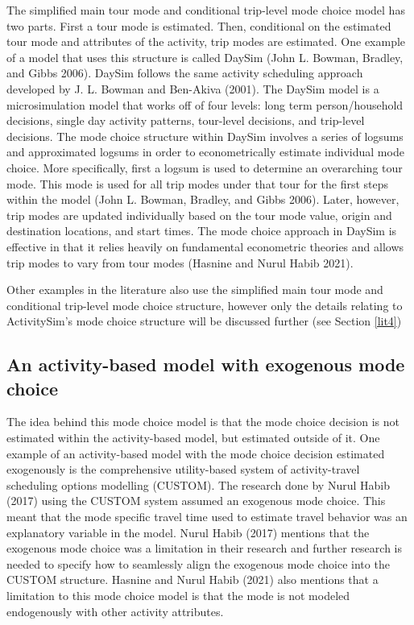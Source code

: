 \documentclass[12pt, oneside, openright]{byuthesis}
\begin{document}
The simplified main tour mode and conditional trip-level mode choice model has two parts. First a tour mode is estimated. Then, conditional on the estimated tour mode and attributes of the activity, trip modes are estimated. One example of a model that uses this structure is called DaySim (John L. Bowman, Bradley, and Gibbs 2006). DaySim follows the same activity scheduling approach developed by J. L. Bowman and Ben-Akiva (2001). The DaySim model is a microsimulation model that works off of four levels: long term person/household decisions, single day activity patterns, tour-level decisions, and trip-level decisions. The mode choice structure within DaySim involves a series of logsums and approximated logsums in order to econometrically estimate individual mode choice. More specifically, first a logsum is used to determine an overarching tour mode. This mode is used for all trip modes under that tour for the first steps within the model (John L. Bowman, Bradley, and Gibbs 2006). Later, however, trip modes are updated individually based on the tour mode value, origin and destination locations, and start times. The mode choice approach in DaySim is effective in that it relies heavily on fundamental econometric theories and allows trip modes to vary from tour modes (Hasnine and Nurul Habib 2021).

Other examples in the literature also use the simplified main tour mode and conditional trip-level mode choice structure, however only the details relating to ActivitySim's mode choice structure will be discussed further (see Section \ref{lit4})

\hypertarget{lit34}{%
\subsection{An activity-based model with exogenous mode choice}\label{lit34}}

The idea behind this mode choice model is that the mode choice decision is not estimated within the activity-based model, but estimated outside of it. One example of an activity-based model with the mode choice decision estimated exogenously is the comprehensive utility-based system of activity-travel scheduling options modelling (CUSTOM). The research done by Nurul Habib (2017) using the CUSTOM system assumed an exogenous mode choice. This meant that the mode specific travel time used to estimate travel behavior was an explanatory variable in the model. Nurul Habib (2017) mentions that the exogenous mode choice was a limitation in their research and further research is needed to specify how to seamlessly align the exogenous mode choice into the CUSTOM structure. Hasnine and Nurul Habib (2021) also mentions that a limitation to this mode choice model is that the mode is not modeled endogenously with other activity attributes.
\end{document}

